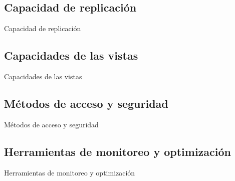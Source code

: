 \subsection{Capacidad de replicación}
\begin{frame}{Capacidad de replicación}
	
\end{frame}


\subsection{Capacidades de las vistas}
\begin{frame}{Capacidades de las vistas}
	
\end{frame}


\subsection{Métodos de acceso y seguridad}
\begin{frame}{Métodos de acceso y seguridad}
	
\end{frame}


\subsection{Herramientas de monitoreo y optimización }
\begin{frame}{Herramientas de monitoreo y optimización }
	
\end{frame}




